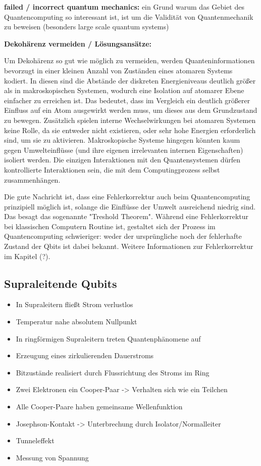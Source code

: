 \textbf{failed / incorrect quantum mechanics:} ein Grund warum das Gebiet des Quantencomputing so interessant ist, ist um die Validität von Quantenmechanik zu beweisen (besonders large scale quantum systems) 

\cite{nielsen_michael_a_and_isaac_l_chuang_quantum_2010}

 
\textbf{Dekohärenz vermeiden / Lösungsansätze: }

Um Dekohärenz so gut wie möglich zu vermeiden, werden Quanteninformationen bevorzugt in einer kleinen Anzahl von Zuständen eines atomaren Systems kodiert. In diesen sind die Abstände der diskreten Energieniveaus deutlich größer als in makroskopischen Systemen, wodurch eine  Isolation auf atomarer Ebene einfacher zu erreichen ist. Das bedeutet, dass im Vergleich ein deutlich größerer Einfluss auf ein Atom ausgewirkt werden muss, um dieses aus dem Grundzustand zu bewegen. Zusätzlich spielen interne Wechselwirkungen bei atomaren Systemen keine Rolle, da sie entweder nicht existieren, oder sehr hohe Energien erforderlich sind, um sie zu aktivieren.
Makroskopische Systeme hingegen könnten kaum gegen Umwelteinflüsse (und ihre eigenen irrelevanten internen Eigenschaften) isoliert werden. Die einzigen Interaktionen mit den Quantensystemen dürfen kontrollierte Interaktionen sein, die mit dem Computingprozess selbst zusammenhängen. 

Die gute Nachricht ist, dass eine Fehlerkorrektur auch beim Quantencomputing prinzipiell möglich ist, solange die Einflüsse der Umwelt ausreichend niedrig sind. Das besagt das sogenannte "Treshold Theorem". Während eine Fehlerkorrektur bei klassischen Computern Routine ist, gestaltet sich der Prozess im Quantencomputing schwieriger: weder der ursprüngliche noch der fehlerhafte Zustand der Qbits ist dabei bekannt. 
Weitere Informationen zur Fehlerkorrektur im Kapitel (?). 
 

 \cite{mermin_quantum_2012}
\subsection{Supraleitende Qubits }

\begin{itemize}
\item In Supraleitern fließt Strom verlustlos
\item Temperatur nahe absolutem Nullpunkt
\item In ringförmigen Supraleitern treten Quantenphänomene auf
\item Erzeugung eines zirkulierenden Dauerstroms
\item Bitzustände realisiert durch Flussrichtung des Stroms im Ring
\item Zwei Elektronen ein Cooper-Paar -> Verhalten sich wie ein Teilchen
\item Alle Cooper-Paare haben gemeinsame Wellenfunktion
\item Josephson-Kontakt -> Unterbrechung durch Isolator/Normalleiter
\item Tunneleffekt
\item Messung von Spannung
\end{itemize}


